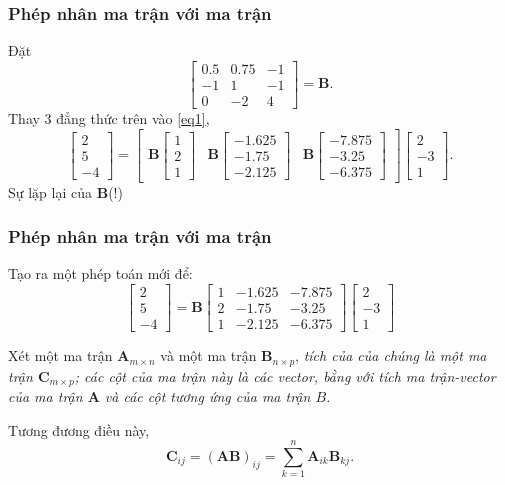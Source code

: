 \begin{frame}
    \frametitle{Phép nhân ma trận với ma trận}
    Đặt
    \[\begin{bmatrix}
    0.5 & 0.75 & -1\\
    -1 & 1 & -1\\
    0 & -2 & 4
\end{bmatrix}=\mathbf{B}.\] Thay 3 đẳng thức trên vào \ref{eq1},
\[\begin{bmatrix}
    2\\5\\-4
\end{bmatrix}=\begin{bmatrix}
    \mathbf{B}\begin{bmatrix}
        1\\2\\1
    \end{bmatrix}&\mathbf{B}\begin{bmatrix}
        -1.625\\-1.75\\-2.125
    \end{bmatrix}&\mathbf{B}\begin{bmatrix}
        -7.875\\-3.25\\-6.375
\end{bmatrix}\end{bmatrix}\begin{bmatrix}
2\\-3\\1
\end{bmatrix}.\]
Sự lặp lại của \(\mathbf{B}\)(!)
\end{frame}
\begin{frame}
    \frametitle{Phép nhân ma trận với ma trận}
    Tạo ra một phép toán mới để:
    \begin{equation}\label{eqmatrix}\begin{bmatrix}
    2\\5\\-4
\end{bmatrix}=\mathbf{B}\begin{bmatrix}
    1&-1.625&-7.875\\
    2&-1.75&-3.25\\
    1&-2.125&-6.375
\end{bmatrix}\begin{bmatrix}
    2\\-3\\1
\end{bmatrix}\end{equation}
\begin{tcolorbox}[colback=blue!10!, colframe=blue!50!black]
    Xét một ma trận \(\mathbf{A}_{m\times n}\) và một ma trận \(\mathbf{B}_{n\times p}\), \emph{tích của của chúng là một ma trận \(\mathbf{C}_{m\times p}\); các cột của ma trận này là các vector, bằng với tích ma trận-vector của ma trận \(\mathbf{A}\) và các cột tương ứng  của ma trận \(B\).}
\end{tcolorbox}
    Tương đương điều này, \begin{equation}\label{eq4}
    \mathbf{C}_{ij}=(\mathbf{AB})_{ij}=\sum_{k=1}^n \mathbf{A}_{ik}\mathbf{B}_{kj}.\end{equation}
\end{frame}
